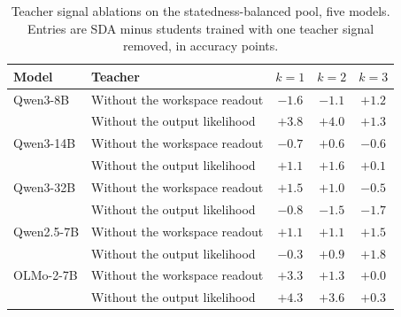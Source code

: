 \begin{table}[t]
\centering
\caption{Teacher signal ablations on the statedness-balanced pool, five models. Entries are SDA minus
students trained with one teacher signal removed, in accuracy points.}
\label{tab:teachermodelpaired}
\small
\setlength{\tabcolsep}{4pt}
\begin{tabular}{llccc}
\toprule
Model & Teacher & $k=1$ & $k=2$ & $k=3$ \\
\midrule
Qwen3-8B & Without the workspace readout & $-1.6$ & $-1.1$ & $+1.2$ \\
 & Without the output likelihood & $+3.8$ & $+4.0$ & $+1.3$ \\
Qwen3-14B & Without the workspace readout & $-0.7$ & $+0.6$ & $-0.6$ \\
 & Without the output likelihood & $+1.1$ & $+1.6$ & $+0.1$ \\
Qwen3-32B & Without the workspace readout & $+1.5$ & $+1.0$ & $-0.5$ \\
 & Without the output likelihood & $-0.8$ & $-1.5$ & $-1.7$ \\
Qwen2.5-7B & Without the workspace readout & $+1.1$ & $+1.1$ & $+1.5$ \\
 & Without the output likelihood & $-0.3$ & $+0.9$ & $+1.8$ \\
OLMo-2-7B & Without the workspace readout & $+3.3$ & $+1.3$ & $+0.0$ \\
 & Without the output likelihood & $+4.3$ & $+3.6$ & $+0.3$ \\
\bottomrule
\end{tabular}
\end{table}
